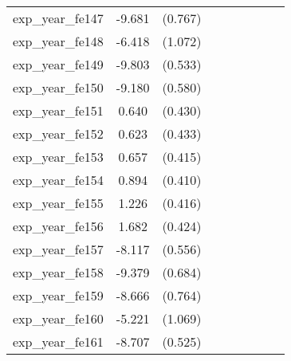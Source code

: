 {\begin{tabular}{l*{4}{cc}}
exp\_year\_fe147&   -9.681\sym{***}&  (0.767)&                  &         &                  &         &                  &         \\
exp\_year\_fe148&   -6.418\sym{***}&  (1.072)&                  &         &                  &         &                  &         \\
exp\_year\_fe149&   -9.803\sym{***}&  (0.533)&                  &         &                  &         &                  &         \\
exp\_year\_fe150&   -9.180\sym{***}&  (0.580)&                  &         &                  &         &                  &         \\
exp\_year\_fe151&    0.640         &  (0.430)&                  &         &                  &         &                  &         \\
exp\_year\_fe152&    0.623         &  (0.433)&                  &         &                  &         &                  &         \\
exp\_year\_fe153&    0.657         &  (0.415)&                  &         &                  &         &                  &         \\
exp\_year\_fe154&    0.894\sym{*}  &  (0.410)&                  &         &                  &         &                  &         \\
exp\_year\_fe155&    1.226\sym{**} &  (0.416)&                  &         &                  &         &                  &         \\
exp\_year\_fe156&    1.682\sym{***}&  (0.424)&                  &         &                  &         &                  &         \\
exp\_year\_fe157&   -8.117\sym{***}&  (0.556)&                  &         &                  &         &                  &         \\
exp\_year\_fe158&   -9.379\sym{***}&  (0.684)&                  &         &                  &         &                  &         \\
exp\_year\_fe159&   -8.666\sym{***}&  (0.764)&                  &         &                  &         &                  &         \\
exp\_year\_fe160&   -5.221\sym{***}&  (1.069)&                  &         &                  &         &                  &         \\
exp\_year\_fe161&   -8.707\sym{***}&  (0.525)&                  &         &                  &         &                  &         \\

\end{tabular}}
